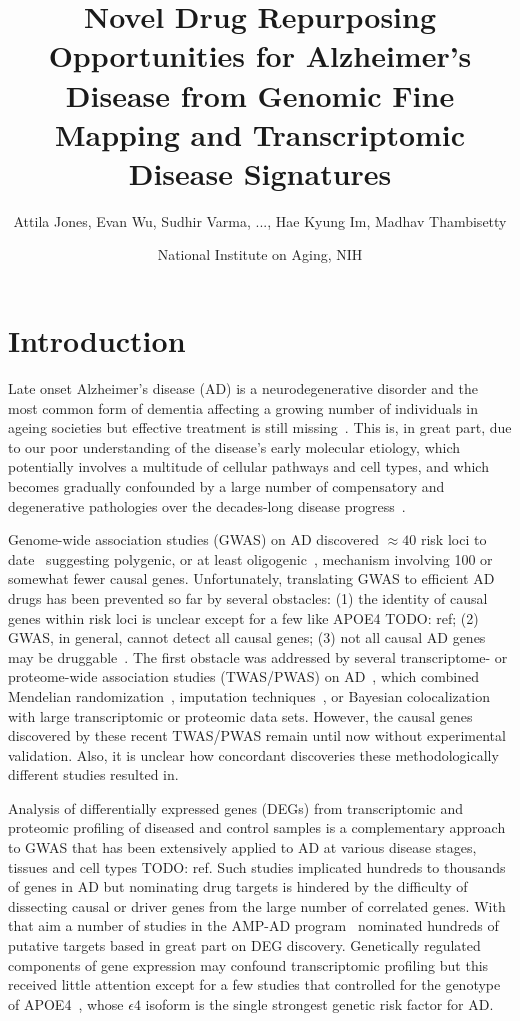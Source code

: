 \documentclass[letterpaper]{article}
\title{Novel Drug Repurposing Opportunities for Alzheimer's Disease from
  Genomic Fine Mapping and Transcriptomic Disease Signatures}
\author{Attila Jones, Evan Wu, Sudhir Varma, ..., Hae Kyung Im, Madhav Thambisetty}
\date{National Institute on Aging, NIH}
\begin{document}
\maketitle

\section{Introduction}

Late onset Alzheimer's disease (AD) is a neurodegenerative disorder and the most
common form of dementia affecting a growing number of individuals in ageing
societies but effective treatment is still
missing~\citep{Bondi2017,Masters2015}.  This is, in great part,
due to our poor understanding of the disease's early molecular etiology,
which potentially involves a multitude of cellular pathways and cell types,
and which becomes gradually confounded by a large number of compensatory
and degenerative pathologies over the decades-long disease
progress~\citep{DeStrooper2016}.

Genome-wide association studies (GWAS) on AD discovered $\approx 40$ risk loci
to date~\citep{Jansen2019,Kunkle2019,Schwartzentruber2021,Wightman2021}
suggesting polygenic, or at least oligogenic~\citep{Zhang2020}, mechanism
involving 100 or somewhat fewer causal genes.  Unfortunately, translating GWAS to
efficient AD drugs has been prevented so far by several obstacles: (1) the
identity of causal genes within risk loci is unclear except for a few like
APOE4 TODO: ref; (2) GWAS, in general, cannot detect all causal genes; (3) not
all causal AD genes may be
druggable~\citep{Cao2014,Lau2020,Floris2018,Finan2017}.  The first obstacle
was addressed by several transcriptome- or proteome-wide association
studies (TWAS/PWAS) on
AD~\citep{Jansen2019,Kunkle2019,Gerring2020,Baird2021,Schwartzentruber2021,Wingo2021},
which combined Mendelian randomization~\citep{DaveySmith2014,Lawlor2008},
imputation techniques~\citep{Barbeira2018,Barbeira2019a}, or Bayesian
colocalization~\citep{Wen2017} with large transcriptomic or proteomic data
sets.  However, the causal genes discovered by these recent TWAS/PWAS remain
until now without experimental validation.  Also, it is unclear how concordant
discoveries these methodologically different studies resulted in.

Analysis of differentially expressed genes (DEGs) from transcriptomic and
proteomic profiling of diseased and control samples is a complementary
approach to GWAS that has been extensively applied to AD at various disease
stages, tissues and cell types TODO: ref.  Such studies implicated hundreds to
thousands of genes in AD but nominating drug targets is hindered by the
difficulty of dissecting causal or driver genes from the large number of
correlated genes.  With that aim a number of studies in the AMP-AD
program~\citep{Greenwood2020} nominated hundreds of putative targets based in
great part on DEG discovery.  Genetically regulated components of gene
expression may confound transcriptomic profiling but this received little attention
except for a few studies that controlled for the genotype of
APOE4~\citep{Taubes2021,Lin2018,RobertsJackson2021}, whose $\epsilon 4$
isoform is the single strongest genetic risk factor for AD.
\end{document}
